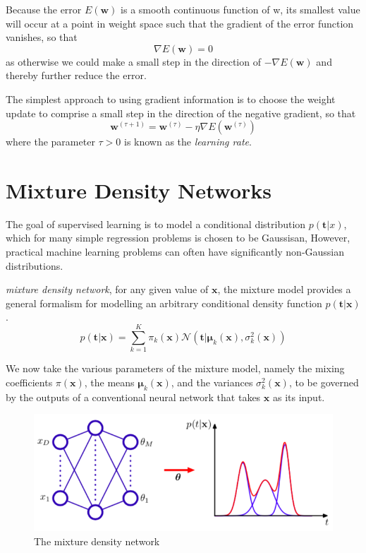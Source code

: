 \documentclass[5p,sort&compress]{elsarticle}
\begin{document}
Because the error $E(\mathbf{w})$ is a smooth continuous function of w, its smallest value will occur at a point in weight space such that the gradient of the error function vanishes, so that
\begin{equation}
\nabla E(\mathbf{w})=0
\end{equation}
as otherwise we could make a small step in the direction of $-\nabla E(\mathbf{w})$ and thereby further reduce the error.

The simplest approach to using gradient information is to choose the weight update to comprise a small step in the direction of the negative gradient, so
that
\begin{equation}
\mathbf{w}^{(\tau+1)}=\mathbf{w}^{(\tau)}-\eta \nabla E\left(\mathbf{w}^{(\tau)}\right)
\end{equation}
where the parameter $\tau > 0$ is known as the \textit{learning rate}.


\section{Mixture Density Networks}

The goal of supervised learning is to model a conditional distribution $p(\mathbf{t}|x)$, which for many simple regression problems is chosen to be Gaussisan, However, practical machine learning problems can often have significantly non-Gaussian distributions.

\textit{mixture density network}, for any given value of $\mathbf{x}$, the mixture model provides a general formalism for modelling an arbitrary conditional density function $p(\mathbf{t}|\mathbf{x})$.
\begin{equation}
p(\mathbf{t} | \mathbf{x})=\sum_{k=1}^{K} \pi_{k}(\mathbf{x}) \mathcal{N}\left(\mathbf{t} | \boldsymbol{\mu}_{k}(\mathbf{x}), \sigma_{k}^{2}(\mathbf{x})\right)
\end{equation}

We now take the various parameters of the mixture model, namely the mixing coefficients $\pi(\mathbf{x})$, the means $\boldsymbol{\mu}_k (\mathbf{x})$, and the variances $\sigma_k^2(\mathbf{x})$, to be governed by the outputs of a conventional neural network that takes $\mathbf{x}$ as its input.

\begin{figure}[ht]
     \centering
     \includegraphics[width = \linewidth]{figure/figure5_20.png}
     \caption{The mixture density network}
     \label{fig:mix}
\end{figure}
\end{document}
